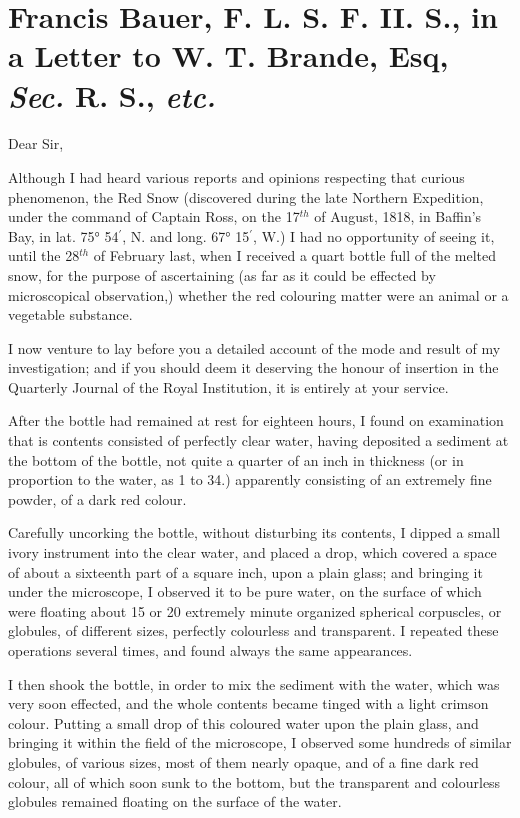 \documentclass[a4paper, 12pt, oneside]{article}
\begin{document}
\section{Francis Bauer, F. L. S. F. II. S., in a Letter to W. T. Brande, Esq, \emph{Sec.} R. S., \emph{etc.}}
\paragraph{}
Dear Sir,

Although I had heard various reports and opinions respecting that curious phenomenon, the Red Snow (discovered during the late Northern Expedition, under the command of Captain Ross, on the 17$^{th}$ of August, 1818, in Baffin's Bay, in lat. 75° 54$^{\prime}$, N. and long. 67° 15$^{\prime}$, W.) I had no opportunity of seeing it, until the 28$^{th}$ of February last, when I received a quart bottle full of the melted snow, for the purpose of ascertaining (as far as it could be effected by microscopical observation,) whether the red colouring matter were an animal or a vegetable substance.

I now venture to lay before you a detailed account of the mode and result of my investigation; and if you should deem it deserving the honour of insertion in the Quarterly Journal of the Royal Institution, it is entirely at your service.

After the bottle had remained at rest for eighteen hours, I found on examination that is contents consisted of perfectly clear water, having deposited a sediment at the bottom of the bottle, not quite a quarter of an inch in thickness (or in proportion to the water, as 1 to 34.) apparently consisting of an extremely fine powder, of a dark red colour.

Carefully uncorking the bottle, without disturbing its contents, I dipped a small ivory instrument into the clear water, and placed a drop, which covered a space of about a sixteenth part of a square inch, upon a plain glass; and bringing it under the microscope, I observed it to be pure water, on the surface of which were floating about 15 or 20 extremely minute organized spherical corpuscles, or globules, of different sizes, perfectly colourless and transparent. I repeated these operations several times, and found always the same appearances.

I then shook the bottle, in order to mix the sediment with the water, which was very soon effected, and the whole contents became tinged with a light crimson colour. Putting a small drop of this coloured water upon the plain glass, and bringing it within the field of the microscope, I observed some hundreds of similar globules, of various sizes, most of them nearly opaque, and of a fine dark red colour, all of which soon sunk to the bottom, but the transparent and colourless globules remained floating on the surface of the water.
\end{document}

